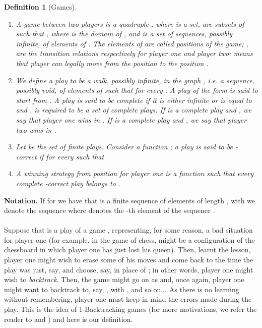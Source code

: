 \documentclass[copyright,creativecommons]{eptcs}
\newtheorem{definition}{Definition}
\begin{document}
\begin{definition}[Games]
\label{definition-Games}
\begin{enumerate}

 \item
 A \emph{game}  between two players is a quadruple ,
where  is a set,  are  subsets of  such that
, where  is the domain of ,  and  is a set of sequences,
possibly infinite, of elements of .  The elements of  are
called \emph{positions} of the game; ,  are the transition
relations respectively for player one and player two:
 means that player  can legally move from the
position  to the position .

 \item We define a \emph{play} to be a walk, possibly infinite, in the
graph , i.e. a sequence, possibly void,   of elements of   such that  for every . A play of the form  is said to \emph{start from}  . A play is said to be
\emph{complete} if it is either infinite or is equal to  and .  is required to be a set of
complete plays. If  is a complete play and , 
we say that player one wins in . If  is a complete play and , 
we say that player two wins in .

 \item
 Let  be the set of finite plays. Consider a function ; a play  is said to be
-correct if  for every  such that


 \item
 A \emph{winning strategy} from position  for player one is a function
 such that every complete
-correct play   belongs to .
 \end{enumerate}
 \end{definition}
 \textbf{Notation.}  If for   we have that  is a finite sequence of elements of length ,  with  we denote the sequence  where  denotes the -th element of the sequence . \\\\
 Suppose that  is a play of a game ,
representing, for some reason, a bad situation for player one (for
example, in the game of chess,  might be a configuration of
the
chessboard in which player one has just lost his queen). Then,
learnt the lesson, player one might wish to erase some of his moves
and come back to the time the play was just, say,  and
choose, say,  in place of ; in other words, player one
might wish to \emph{backtrack}. Then, the game might go on as
 and, once again, player one might want to
backtrack to, say, , with , and so
on... As there is no learning without remembering, player one
must keep in mind  the errors made during the play. This is the
idea
of 1-Backtracking games  (for more motivations, we refer the reader to \cite{BerCoq} and \cite{BerLig}) and here is our definition. 
\end{document}
